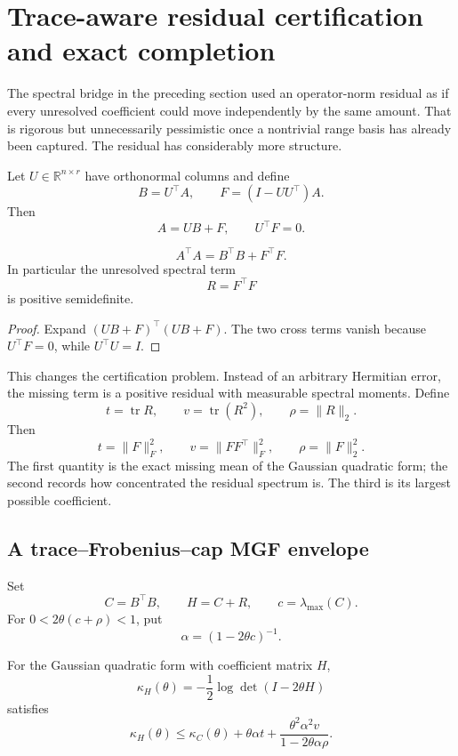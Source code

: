 \section{Trace-aware residual certification and exact completion}\label{sec:final-23}

The spectral bridge in the preceding section used an operator-norm residual as
if every unresolved coefficient could move independently by the same amount.
That is rigorous but unnecessarily pessimistic once a nontrivial range basis
has already been captured.  The residual has considerably more structure.

Let \(U\in\mathbb R^{n\times r}\) have orthonormal columns and define
\[
B=U^\top A,
\qquad
F=(I-UU^\top)A.
\]
Then
\[
A=UB+F,
\qquad
U^\top F=0.
\]

\begin{theorem}\label{claim:final-23-1}
\[
\boxed{
A^\top A
=
B^\top B+F^\top F.
}
\]
In particular the unresolved spectral term
\[
R=F^\top F
\]
is positive semidefinite.
\end{theorem}

\begin{proof}
Expand \((UB+F)^\top(UB+F)\).  The two cross terms vanish because
\(U^\top F=0\), while \(U^\top U=I\).
\end{proof}

This changes the certification problem.  Instead of an arbitrary Hermitian
error, the missing term is a positive residual with measurable spectral
moments.  Define
\[
t=\operatorname{tr}R,
\qquad
v=\operatorname{tr}(R^2),
\qquad
\rho=\|R\|_2.
\]
Then
\[
\boxed{
 t=\|F\|_F^2,
 \qquad
 v=\|FF^\top\|_F^2,
 \qquad
 \rho=\|F\|_2^2.
}
\]
The first quantity is the exact missing mean of the Gaussian quadratic form;
the second records how concentrated the residual spectrum is. The third is its
largest possible coefficient.

\subsection{A trace--Frobenius--cap MGF envelope}

Set
\[
C=B^\top B,
\qquad
H=C+R,
\qquad
c=\lambda_{\max}(C).
\]
For \(0<2\theta(c+\rho)<1\), put
\[
\alpha=(1-2\theta c)^{-1}.
\]

\begin{theorem}\label{claim:final-23-2}
For the Gaussian quadratic form with coefficient matrix \(H\),
\[
\kappa_H(\theta)
=-\frac12\log\det(I-2\theta H)
\]
satisfies
\[
\boxed{
\kappa_H(\theta)
\le
\kappa_C(\theta)
+
\theta\alpha t
+
\frac{\theta^2\alpha^2v}
     {1-2\theta\alpha\rho}.
}
\]
\end{theorem}

